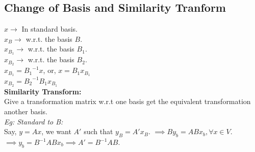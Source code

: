 \subsection{Change of Basis and Similarity Tranform}

$x \rightarrow $ In standard basis.\\
$x_B \rightarrow$ w.r.t. the basis $B$.\\
$x_{B_1} \rightarrow$ w.r.t. the basis $B_1$.\\
$x_{B_2} \rightarrow$ w.r.t. the basis $B_2$.\\

$x_{B_1} = {B_1}^{-1} x$, or, $x = B_1x_{B_1}$\\
$x_{B_2} = {B_2}^{-1}B_1x_{B_1}$\\


\textbf{Similarity Transform:}\\

Give a transformation matrix w.r.t one basis get the equivalent transformation
another basis. \\
\textit{Eg: Standard to B:}\\
Say, $y = Ax$, we want $A'$ such that $y_{B} = A' x_B$.
$\implies By_b = ABx_b, \forall x \in V$.
$\implies y_b = B^{-1}ABx_b \implies A' = B^{-1}AB$.